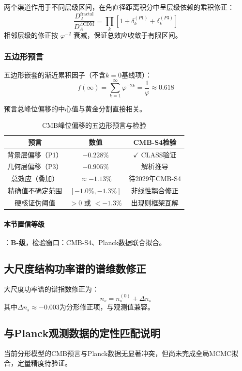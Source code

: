 \documentclass[12pt,a4paper,twocolumn]{article}
\renewcommand{\phi}{\varphi}
\begin{document}
两个渠道作用于不同层级区间，在角直径距离积分中呈层级依赖的乘积修正：
\begin{equation}
\frac{D_A^{\text{fractal}}}{D_A^{\Lambda\text{CDM}}} = \prod_{k} \left[1+\delta_k^{(P1)}+\delta_k^{(P3)}\right]
\end{equation}
相邻层级的修正按 $\phi^{-2}$ 衰减，保证总效应收敛于有限区间。

\subsubsection{五边形预言}

五边形嵌套的渐近累积因子（不含$k=0$基线项）：
\begin{equation}
f(\infty) = \sum_{k=1}^{\infty}\phi^{-2k} = \frac{1}{\phi} \approx 0.618
\end{equation}

预言总峰位偏移的中心值与黄金分割直接相关。

\begin{table}[H]
\centering
\footnotesize
\caption{CMB峰位偏移的五边形预言与检验}
\begin{tabular}{c|c|c}
\hline
\textbf{预言} & \textbf{数值} & \textbf{CMB-S4检验} \\
\hline
背景层偏移（P1） & $-0.228\%$ & $\checkmark$ CLASS验证 \\
几何层偏移（P3） & $-0.905\%$ & 解析推导 \\
总效应（叠加） & $\approx -1.13\%$ & 待2029年CMB-S4 \\
精确值不确定范围 & $[-1.0\%, -1.3\%]$ & 非线性耦合修正 \\
硬核证伪阈值 & $>0$ 或 $<-1.3\%$ & 出现则框架瓦解 \\
\hline
\end{tabular}
\end{table}

\paragraph{本节置信等级}：\textbf{B-级}，检验窗口：CMB-S4、Planck数据联合拟合。

\subsection{大尺度结构功率谱的谱维数修正}
大尺度功率谱的谱指数修正为：
\[
n_s = n_s^{(0)} + \Delta n_s
\]
其中$\Delta n_s \approx -0.003$为分形修正项，与观测值兼容。

\subsection{与Planck观测数据的定性匹配说明}
当前分形模型的CMB预言与Planck数据无显著冲突，但尚未完成全局MCMC拟合，定量精度待验证。
\end{document}
